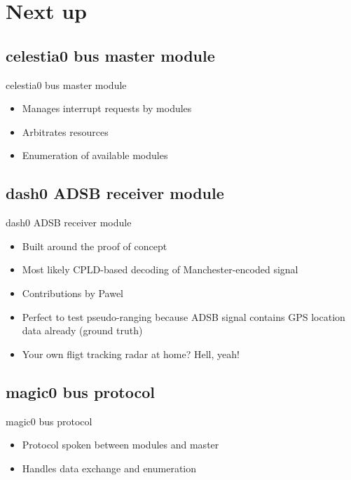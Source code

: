 \section{Next up}	

\subsection{celestia0 bus master module}
	\begin{frame}{celestia0 bus master module}
		\begin{itemize}
			\item Manages interrupt requests by modules
			\item Arbitrates resources
			\item Enumeration of available modules
		\end{itemize}
	\end{frame}

\subsection{dash0 ADSB receiver module}
	\begin{frame}{dash0 ADSB receiver module}
		\begin{itemize}
			\item Built around the proof of concept
			\item Most likely CPLD-based decoding of Manchester-encoded signal
			\item Contributions by Pawel
			\item Perfect to test pseudo-ranging because ADSB signal contains GPS location data already (ground truth)
			\item Your own fligt tracking radar at home?  Hell, yeah!
		\end{itemize}
	\end{frame}

\subsection{magic0 bus protocol}
	\begin{frame}{magic0 bus protocol}
		\begin{itemize}
			\item Protocol spoken between modules and master
			\item Handles data exchange and enumeration
		\end{itemize}
	\end{frame}

